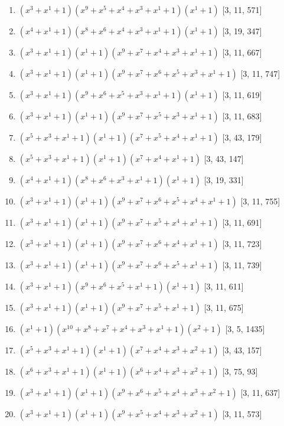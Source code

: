 \documentclass[10pt,twocolumn]{article}
\begin{document}
\begin{enumerate}
\item $(x^{3} + x^{1} + 1)(x^{9} + x^{5} + x^{4} + x^{3} + x^{1} + 1)(x^{1} + 1)$  [3, 11, 571]
\item $(x^{4} + x^{1} + 1)(x^{8} + x^{6} + x^{4} + x^{3} + x^{1} + 1)(x^{1} + 1)$  [3, 19, 347]
\item $(x^{3} + x^{1} + 1)(x^{1} + 1)(x^{9} + x^{7} + x^{4} + x^{3} + x^{1} + 1)$  [3, 11, 667]
\item $(x^{3} + x^{1} + 1)(x^{1} + 1)(x^{9} + x^{7} + x^{6} + x^{5} + x^{3} + x^{1} + 1)$  [3, 11, 747]
\item $(x^{3} + x^{1} + 1)(x^{9} + x^{6} + x^{5} + x^{3} + x^{1} + 1)(x^{1} + 1)$  [3, 11, 619]
\item $(x^{3} + x^{1} + 1)(x^{1} + 1)(x^{9} + x^{7} + x^{5} + x^{3} + x^{1} + 1)$  [3, 11, 683]
\item $(x^{5} + x^{3} + x^{1} + 1)(x^{1} + 1)(x^{7} + x^{5} + x^{4} + x^{1} + 1)$  [3, 43, 179]
\item $(x^{5} + x^{3} + x^{1} + 1)(x^{1} + 1)(x^{7} + x^{4} + x^{1} + 1)$  [3, 43, 147]
\item $(x^{4} + x^{1} + 1)(x^{8} + x^{6} + x^{3} + x^{1} + 1)(x^{1} + 1)$  [3, 19, 331]
\item $(x^{3} + x^{1} + 1)(x^{1} + 1)(x^{9} + x^{7} + x^{6} + x^{5} + x^{4} + x^{1} + 1)$  [3, 11, 755]
\item $(x^{3} + x^{1} + 1)(x^{1} + 1)(x^{9} + x^{7} + x^{5} + x^{4} + x^{1} + 1)$  [3, 11, 691]
\item $(x^{3} + x^{1} + 1)(x^{1} + 1)(x^{9} + x^{7} + x^{6} + x^{4} + x^{1} + 1)$  [3, 11, 723]
\item $(x^{3} + x^{1} + 1)(x^{1} + 1)(x^{9} + x^{7} + x^{6} + x^{5} + x^{1} + 1)$  [3, 11, 739]
\item $(x^{3} + x^{1} + 1)(x^{9} + x^{6} + x^{5} + x^{1} + 1)(x^{1} + 1)$  [3, 11, 611]
\item $(x^{3} + x^{1} + 1)(x^{1} + 1)(x^{9} + x^{7} + x^{5} + x^{1} + 1)$  [3, 11, 675]
\item $(x^{1} + 1)(x^{10} + x^{8} + x^{7} + x^{4} + x^{3} + x^{1} + 1)(x^{2} + 1)$  [3, 5, 1435]
\item $(x^{5} + x^{3} + x^{1} + 1)(x^{1} + 1)(x^{7} + x^{4} + x^{3} + x^{2} + 1)$  [3, 43, 157]
\item $(x^{6} + x^{3} + x^{1} + 1)(x^{1} + 1)(x^{6} + x^{4} + x^{3} + x^{2} + 1)$  [3, 75, 93]
\item $(x^{3} + x^{1} + 1)(x^{1} + 1)(x^{9} + x^{6} + x^{5} + x^{4} + x^{3} + x^{2} + 1)$  [3, 11, 637]
\item $(x^{3} + x^{1} + 1)(x^{1} + 1)(x^{9} + x^{5} + x^{4} + x^{3} + x^{2} + 1)$  [3, 11, 573]

\end{enumerate}
\end{document}
